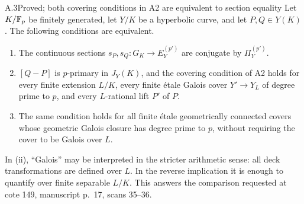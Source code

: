 \begin{claim}{A.3}{Proved; both covering conditions in A2 are equivalent to section equality}
Let $K/\mathbb F_p$ be finitely generated, let $Y/K$ be a hyperbolic curve,
and let $P,Q\in Y(K)$. The following conditions are equivalent.
\begin{enumerate}[label=(\roman*)]
\item The continuous sections $s_P,s_Q:G_K\to E_Y^{(p')}$ are
conjugate by $\Pi_Y^{(p')}$.
\item $[Q-P]$ is $p$-primary in $J_Y(K)$, and the covering condition
of A2 holds for every finite extension $L/K$, every finite \'etale
Galois cover $Y'\to Y_L$ of degree prime to $p$, and every
$L$-rational lift $P'$ of $P$.
\item The same condition holds for all finite \'etale geometrically
connected covers whose geometric Galois closure has degree prime
to $p$, without requiring the cover to be Galois over $L$.
\end{enumerate}
In (ii), ``Galois'' may be interpreted in the stricter arithmetic
sense: all deck transformations are defined over $L$. In the reverse
implication it is enough to quantify over finite separable $L/K$.
This answers the comparison requested at cote 149, manuscript
p.~17, scans 35--36.
\end{claim}
